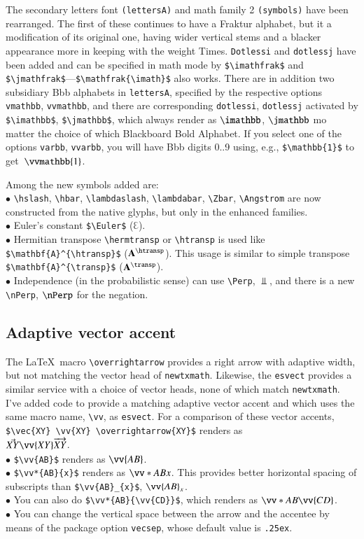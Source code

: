 \documentclass[11pt]{article}
\theoremstyle{oldplain}
\theoremstyle{plain}
\begin{document}
The secondary letters font {\tt (lettersA)} and math family 2 {\tt(symbols)} have been rearranged. The first of these continues to have a Fraktur alphabet, but it a modification of its original one, having wider vertical stems and a blacker appearance more in keeping with the weight Times. {\tt Dotlessi} and {\tt dotlessj} have been added and can be specified in math mode by \verb|$\imathfrak$| and \verb|$\jmathfrak$|---\verb|$\mathfrak{\imath}$| also works. There are in addition two subsidiary Bbb alphabets in {\tt lettersA}, specified by the respective options {\tt vmathbb}, {\tt vvmathbb}, and there are corresponding {\tt dotlessi}, {\tt dotlessj} activated by \verb|$\imathbb$|, \verb|$\jmathbb$|, which always render as $\imathbb$, $\jmathbb$ mo matter the choice of which Blackboard Bold Alphabet. If you select one of the options {\tt varbb}, {\tt vvarbb}, you will have Bbb digits 0..9 using, e.g., \verb|$\mathbb{1}$| to get~$\vvmathbb{1}$.

Among the new symbols added are:\\
$\bullet$ \verb|\hslash|, \verb|\hbar|, \verb|\lambdaslash|, \verb|\lambdabar|, \verb|\Zbar|, \verb|\Angstrom| are now constructed from the native glyphs, but only in the enhanced families.\\
$\bullet$ Euler's constant \verb|$\Euler$| ($\Euler$).\\
$\bullet$ Hermitian transpose \verb|\hermtransp| or \verb|\htransp| is used like \verb|$\mathbf{A}^{\htransp}$| ($\mathbf{A}^{\htransp}$). This usage is similar to simple transpose \verb|$\mathbf{A}^{\transp}$| ($\mathbf{A}^{\transp}$).\\
$\bullet$ Independence (in the probabilistic sense) can use \verb|\Perp|, $\Perp$, and there is a new \verb|\nPerp|, $\nPerp$ for the negation.

\subsection{Adaptive vector accent} The \LaTeX\ macro \verb|\overrightarrow| provides a right arrow with adaptive width, but not matching the vector head of {\tt newtxmath}. Likewise, the {\tt esvect} provides a similar service with a choice of vector heads, none of which match {\tt newtxmath}. I've added code to provide a matching adaptive vector accent and which uses the same macro name, \verb|\vv|, as {\tt esvect}.
For a comparison of these vector accents, \verb|$\vec{XY} \vv{XY} \overrightarrow{XY}$| renders as\\ 
$\vec{XY} \vv{XY} \overrightarrow{XY}$.\\ 
$\bullet$ \verb|$\vv{AB}$|  renders as $\vv{AB}$.\\ 
$\bullet$ \verb|$\vv*{AB}{x}$| renders as $\vv*{AB}{x}$. This provides better horizontal spacing of subscripts than \verb|$\vv{AB}_{x}$|, $\vv{AB}_{x}$.\\
$\bullet$  You can also do \verb|$\vv*{AB}{\vv{CD}}$|, which  renders as $\vv*{AB}{\vv{CD}}$.\\
$\bullet$ You can change the vertical space between the arrow and the accentee by means of the package option {\tt vecsep}, whose default value is {\tt .25ex}.
\end{document}
